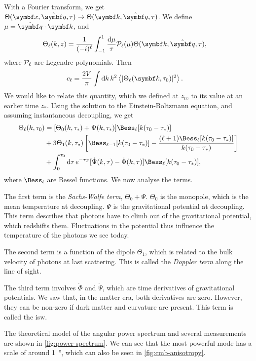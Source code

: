 With a Fourier transform, we get $\Theta(\vec{x}, \uvec{q}, \tau) \to \Theta(\vec{k}, \uvec{q}, \tau)$.
We define $\mu = \uvec{q} \cdot \vec{k}$, and
\begin{align*}
	\Theta_\ell(k, z)
	&= \frac{1}{(-i)^\ell}
	\int_{-1}^1 \frac{\dd{\mu}}{\tau} \Leg_\ell(\mu) \Theta(\vec{k}, \uvec{q}, \tau),
\end{align*}
where $\mathcal{P}_\ell$ are Legendre polynomials. Then
\begin{align*}
	c_\ell
	&= \frac{2 V}{\pi} \int \dd{k} k^2 \avg{\abs{\Theta_\ell(\vec{k}, \tau_0)}^2}.
\end{align*}
We would like to relate this quantity, which we defined at $z_0$, to its value at an earlier time $z_*$. Using the solution to the Einstein-Boltzmann equation, and assuming instantaneous decoupling, we get
\begin{align*}
	\Theta_\ell(k, \tau_0)
	&= [\Theta_0(k, \tau_*) + \Psi(k, \tau_*)]
	\Bess_\ell [k(\tau_0 - \tau_*)]\\
	&+ 3 \Theta_1(k, \tau_*) 
	\left[ \Bess_{\ell-1} [k(\tau_0-\tau_*)]
	- \frac{(\ell+1) \Bess_\ell[k(\tau_0-\tau_*)]}{k (\tau_0-\tau_*)}
	\right]\\
	&+ \int_0^{\tau_0} \dd{\tau} e^{-\tau_T}
	[\dot{\Psi}(k,\tau) - \dot{\Phi}(k, \tau)]
	\Bess_\ell [k(\tau_0-\tau_*)]
	,
\end{align*}
where $\Bess_l$ are Bessel functions. We now analyse the terms.

The first term is the \emph{Sachs-Wolfe term}, $\Theta_0 + \Psi$. $\Theta_0$ is the monopole, which is the mean temperature at decoupling. $\Psi$ is the gravitational potential at decoupling. This term describes that photons have to climb out of the gravitational potential, which redshifts them. Fluctuations in the potential thus influence the temperature of the photons we see today.

The second term is a function of the dipole $\Theta_1$, which is related to the bulk velocity of photons at last scattering. This is called the \emph{Doppler term} along the line of sight.


The third term involves $\dot{\Phi}$ and $\dot{\Psi}$, which are time derivatives of gravitational potentials. We saw that, in the matter era, both derivatives are zero. However, they can be non-zero if dark matter and curvature are present. This term is called the \ac{isw}.

The theoretical model of the angular power spectrum and several measurements are shown in \cref{fig:power-spectrum}. We can see that the most powerful mode has a scale of around \SI{1}{\degree}, which can also be seen in \cref{fig:cmb-anisotropy}.


